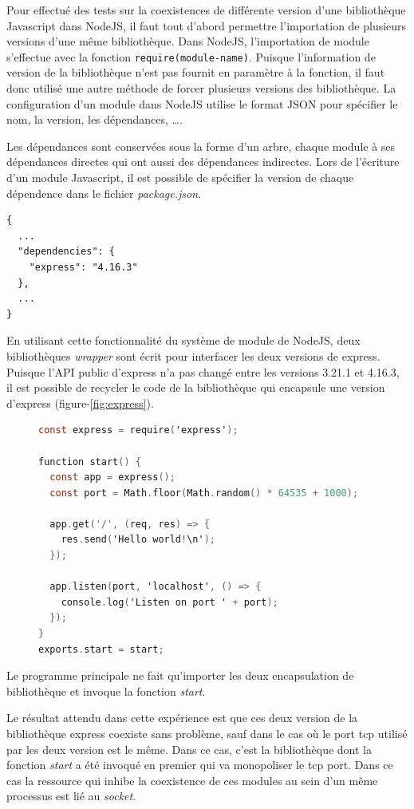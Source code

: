 Pour effectué des tests sur la coexistences de différente version d'une bibliothèque
Javascript dans NodeJS, il faut tout d'abord permettre l'importation de plusieurs
versions d'une même bibliothèque. Dans NodeJS, l'importation de module s'effectue
avec la fonction \verb|require(module-name)|. Puisque l'information de version
de la bibliothèque n'est pas fournit en paramètre à la fonction, il faut donc
utilisé une autre méthode de forcer plusieurs versions des bibliothèque.
La configuration d'un module dans NodeJS utilise le format JSON pour spécifier
le nom, la version, les dépendances, \dots.

Les dépendances sont conservées sous la forme d'un arbre, chaque module à ses dépendances directes
qui ont aussi des dépendances indirectes.  Lors de l'écriture d'un module Javascript, il est possible
de spécifier la version de chaque dépendence dans le fichier \textit{package.json}.
\begin{verbatim}
{
  ...
  "dependencies": {
    "express": "4.16.3"
  },
  ...
}
\end{verbatim}
En utilisant cette fonctionnalité du système de module de NodeJS, deux bibliothèques \textit{wrapper}
sont écrit pour interfacer les deux versions de express. Puisque l'API public d'express n'a pas changé entre
les versions 3.21.1 et 4.16.3, il est possible de recycler le code de la bibliothèque qui encapsule une
version d'express (figure-\ref{fig:express}).
\begin{center}
\begin{figure}[ht]
    \begin{lstlisting}[language=C,frame=single]
const express = require('express');

function start() {
  const app = express();
  const port = Math.floor(Math.random() * 64535 + 1000);

  app.get('/', (req, res) => {
    res.send('Hello world!\n');
  });

  app.listen(port, 'localhost', () => {
    console.log('Listen on port ' + port);
  });
}
exports.start = start;
\end{lstlisting}
\end{figure}
\label{fig:express}
\end{center}
Le programme principale ne fait qu'importer les deux encapsulation de bibliothèque
et invoque la fonction \textit{start}.

Le résultat attendu dans cette expérience est que ces deux version de la bibliothèque
express coexiste sans problème, sauf dans le cas où le port tcp utilisé par les deux
version est le même. Dans ce cas, c'est la bibliothèque dont la fonction
\textit{start} a été invoqué en premier qui va monopoliser le tcp port. Dans ce cas
la ressource qui inhibe la coexistence de ces modules au sein d'un même processus
est lié au \textit{socket}.

